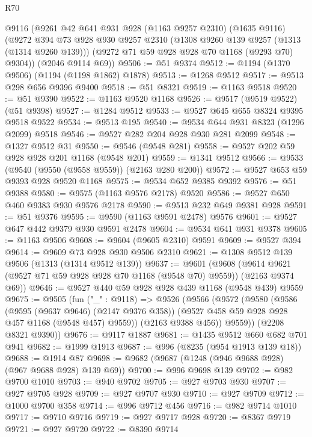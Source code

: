 \begin{lexlean}{R70}
\begin{coremodule}
    @9116
    (@9261
      @42
      @641
      @931
      @928
      (@1163 @9257 @2310)
      (@1635 @9116)
      (@9272
        @394
        @73
        @928
        @930
        @9257
        @2310
        (@1308 @9260 @139 @9257 (@1313 (@1314 @9260 @139)))
        (@9272 @71 @59 @928 @928 @70 @1168 (@9293 @70) @9304))
      (@2046 @9114 @69))
@9506 := @51 @9374
@9512 := @1194 (@1370 @9506) (@1194 (@1198 @1862) @1878)
@9513 := @1268 @9512
@9517 := @9513 @298 @656 @9396 @9400
@9518 := @51 @8321
@9519 := @1163 @9518
@9520 := @51 @9390
@9522 := @1163 @9520 @1168
@9526 := @9517 (@9519 @9522) (@51 @9398)
@9527 := @1284 @9512
@9533 := @9527 @645 @655 @8324 @9395 @9518 @9522
@9534 := @9513 @195
@9540 := @9534 @644 @931 @8323 (@1296 @2099) @9518
@9546 := @9527 @282 @204 @928 @930 @281 @2099
@9548 := @1327 @9512 @31
@9550 := @9546 (@9548 @281)
@9558 := @9527 @202 @59 @928 @928 @201 @1168 (@9548 @201)
@9559 := @1341 @9512
@9566 := @9533 (@9540 (@9550 (@9558 @9559)) (@2163 @280 @200))
@9572 := @9527 @653 @59 @9393 @928 @9520 @1168
@9575 := @9534 @652 @9385 @9392
@9576 := @51 @9388
@9580 := @9575 (@1163 @9576 @2178) @9520
@9586 := @9527 @650 @460 @9383 @930 @9576 @2178
@9590 := @9513 @232 @649 @9381 @928
@9591 := @51 @9376
@9595 := @9590 (@1163 @9591 @2478) @9576
@9601 := @9527 @647 @442 @9379 @930 @9591 @2478
@9604 := @9534 @641 @931 @9378
@9605 := @1163 @9506
@9608 := @9604 (@9605 @2310) @9591
@9609 := @9527 @394
@9614 := @9609 @73 @928 @930 @9506 @2310
@9621 := @1308 @9512 @139 @9506 (@1313 (@1314 @9512 @139))
@9637 := @9601
    (@9608 (@9614 @9621 (@9527 @71 @59 @928 @928 @70 @1168 (@9548 @70) @9559)) (@2163 @9374 @69))
@9646 := @9527 @440 @59 @928 @928 @439 @1168 (@9548 @439) @9559
@9675 := @9505
    (fun ("_" : @9118) =>
    @9526
      (@9566
        (@9572
          (@9580
            (@9586
              (@9595 (@9637 @9646) (@2147 @9376 @358))
              (@9527 @458 @59 @928 @928 @457 @1168 (@9548 @457) @9559))
            (@2163 @9388 @456))
          @9559))
      (@2208 @8321 @9390))
@9676 := @9117 @1887
@9681 := @1435 @9512 @660 @682 @701 @941
@9682 := @1999 @1913
@9687 := @996 (@8235 (@954 @1913 @139 @18))
@9688 := @1914 @87
@9698 := @9682 (@9687 (@1248 (@946 @9688 @928) (@967 @9688 @928) @139 @69))
@9700 := @996 @9698 @139
@9702 := @982 @9700 @1010
@9703 := @940 @9702
@9705 := @927 @9703 @930
@9707 := @927 @9705 @928
@9709 := @927 @9707 @930
@9710 := @927 @9709
@9712 := @1000 @9700 @358
@9714 := @996 @9712 @456
@9716 := @982 @9714 @1010
@9717 := @9710 @9716
@9719 := @927 @9717 @928
@9720 := @8367 @9719
@9721 := @927 @9720
@9722 := @8390 @9714

\end{coremodule}
\end{lexlean}
